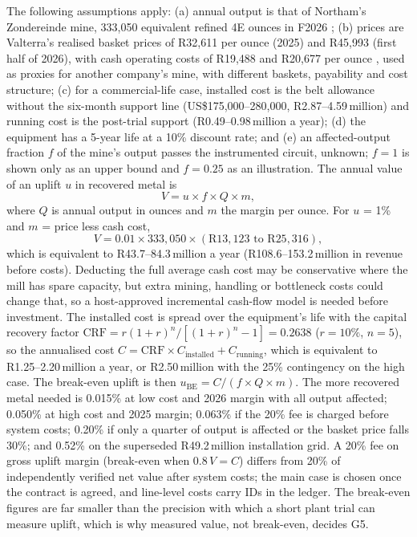 \documentclass[10pt,a4paper,twocolumn]{article}
\begin{document}
The following assumptions apply: (a) annual output is that of Northam's Zondereinde mine, 333,050 equivalent refined 4E ounces in F2026 \cite{northam2026}; (b) prices are Valterra's realised basket prices of R32,611 per ounce (2025) and R45,993 (first half of 2026), with cash operating costs of R19,488 and R20,677 per ounce \cite{valterra2025,valterra2026}, used as proxies for another company's mine, with different baskets, payability and cost structure; (c) for a commercial-life case, installed cost is the belt allowance without the six-month support line (US\$175,000--280,000, R2.87--4.59\,million) and running cost is the post-trial support (R0.49--0.98\,million a year); (d) the equipment has a 5-year life at a 10\% discount rate; and (e) an affected-output fraction $f$ of the mine's output passes the instrumented circuit, unknown; $f=1$ is shown only as an upper bound and $f=0.25$ as an illustration. The annual value of an uplift $u$ in recovered metal is
\begin{equation}
V = u \times f \times Q \times m ,
\end{equation}
where $Q$ is annual output in ounces and $m$ the margin per ounce. For $u$ = 1\% and $m$ = price less cash cost,
\begin{equation}
V = 0.01 \times 333{,}050 \times (\text{R}13{,}123 \text{ to } \text{R}25{,}316),
\end{equation}
which is equivalent to R43.7--84.3\,million a year (R108.6--153.2\,million in revenue before costs). Deducting the full average cash cost may be conservative where the mill has spare capacity, but extra mining, handling or bottleneck costs could change that, so a host-approved incremental cash-flow model is needed before investment. The installed cost is spread over the equipment's life with the capital recovery factor
$\text{CRF} = r(1+r)^n/[(1+r)^n-1] = 0.2638$ ($r = 10\%$, $n = 5$), so the annualised cost $C = \text{CRF} \times C_{\text{installed}} + C_{\text{running}}$, which is equivalent to R1.25--2.20\,million a year, or R2.50\,million with the 25\% contingency on the high case. The break-even uplift is then $u_{\text{BE}} = C/(f \times Q \times m)$. The more recovered metal needed is 0.015\% at low cost and 2026 margin with all output affected; 0.050\% at high cost and 2025 margin; 0.063\% if the 20\% fee is charged before system costs; 0.20\% if only a quarter of output is affected or the basket price falls 30\%; and 0.52\% on the superseded R49.2\,million installation grid. A 20\% fee on gross uplift margin (break-even when $0.8\,V = C$) differs from 20\% of independently verified net value after system costs; the main case is chosen once the contract is agreed, and line-level costs carry IDs in the ledger. The break-even figures are far smaller than the precision with which a short plant trial can measure uplift, which is why measured value, not break-even, decides G5.
\end{document}
